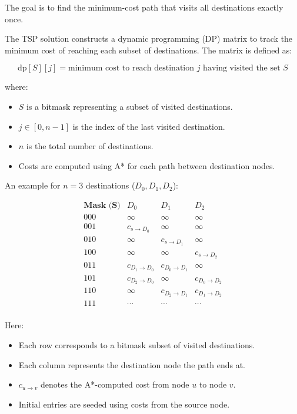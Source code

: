 \documentclass[12pt]{article}
\begin{document}
The goal is to find the minimum-cost path that visits all destinations exactly once.

The TSP solution constructs a dynamic programming (DP) matrix to track the minimum cost of reaching each subset of destinations. The matrix is defined as:

\[
\text{dp}[S][j] = \text{minimum cost to reach destination } j \text{ having visited the set } S
\]

where:
\begin{itemize}
    \item \( S \) is a bitmask representing a subset of visited destinations.
    \item \( j \in [0, n-1] \) is the index of the last visited destination.
    \item \( n \) is the total number of destinations.
    \item Costs are computed using A* for each path between destination nodes.
\end{itemize}

\vspace{1em}

An example for \( n = 3 \) destinations (\( D_0, D_1, D_2 \)):

\[
\begin{array}{c|ccc}
\textbf{Mask (S)} & D_0 & D_1 & D_2 \\
\hline
000 & \infty & \infty & \infty \\
001 & c_{s \rightarrow D_0} & \infty & \infty \\
010 & \infty & c_{s \rightarrow D_1} & \infty \\
100 & \infty & \infty & c_{s \rightarrow D_2} \\
011 & c_{D_1 \rightarrow D_0} & c_{D_0 \rightarrow D_1} & \infty \\
101 & c_{D_2 \rightarrow D_0} & \infty & c_{D_0 \rightarrow D_2} \\
110 & \infty & c_{D_2 \rightarrow D_1} & c_{D_1 \rightarrow D_2} \\
111 & \cdots & \cdots & \cdots \\
\end{array}
\]

Here:
\begin{itemize}
    \item Each row corresponds to a bitmask subset of visited destinations.
    \item Each column represents the destination node the path ends at.
    \item \( c_{u \rightarrow v} \) denotes the A*-computed cost from node \( u \) to node \( v \).
    \item Initial entries are seeded using costs from the source node.
\end{itemize}
\end{document}
